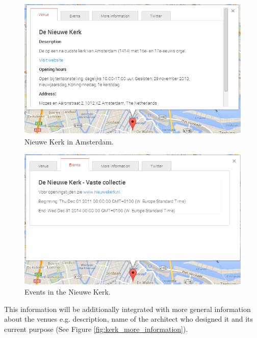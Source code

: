 \documentclass[hidelinks,a4paper]{article}
\begin{document}
\begin{figure}[h!]
  \centering
    \includegraphics[scale=0.48]{images/kerk_venue.png}    
    \caption{Nieuwe Kerk in Amsterdam.}
    \label{fig:kerk_venue}
\end{figure}

\begin{figure}[h!]
  \centering
    \includegraphics[scale=0.48]{images/kerk_events.png}    
    \caption{Events in the Nieuwe Kerk.}
    \label{fig:kerk_events}
\end{figure}

\indent This information will be additionally integrated with more general information about the venues e.g. description, name of the architect who designed it and its current purpose (See Figure \ref{fig:kerk_more_information}). 
\end{document}
